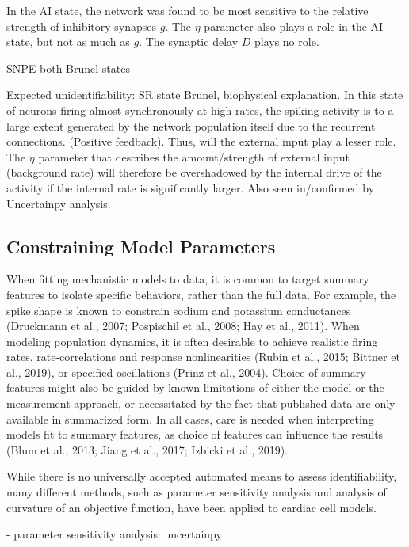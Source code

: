 In the AI state, the network was found to be most sensitive to the relative strength of inhibitory synapses $g$. The $\eta$ parameter also plays a role in the AI state, but not as much as $g$. The synaptic delay $D$ plays no role. 

SNPE both Brunel states

Expected unidentifiability: SR state Brunel, biophysical explanation. In this state of neurons firing almost synchronously at high rates, the spiking activity is to a large extent generated by the network population itself due to the recurrent connections. (Positive feedback). Thus, will the external input play a lesser role. The $\eta$ parameter that describes the amount/strength of external input (background rate) will therefore be overshadowed by the internal drive of the activity if the internal rate is significantly larger. Also seen in/confirmed by Uncertainpy analysis.

\subsection{Constraining Model Parameters}


When fitting mechanistic models to data, it is common to target summary features to isolate specific behaviors, rather than the full data. For example, the spike shape is known to constrain sodium and potassium conductances (Druckmann et al., 2007; Pospischil et al., 2008; Hay et al., 2011). When modeling population dynamics, it is often desirable to achieve realistic firing rates, rate-correlations and response nonlinearities (Rubin et al., 2015; Bittner et al., 2019), or specified oscillations (Prinz et al., 2004). Choice of summary features might also be guided by known limitations of either the model or the measurement approach, or necessitated by the fact that published data are only available in summarized form.  In all cases, care is needed when interpreting models fit to summary features, as choice of features can influence the results (Blum et al., 2013; Jiang et al., 2017; Izbicki et al., 2019).


While there is no universally accepted automated means to assess identifiability, many different methods, such as parameter sensitivity analysis and analysis of curvature of an objective function, have been applied to cardiac cell models.   


- parameter sensitivity analysis: uncertainpy 

